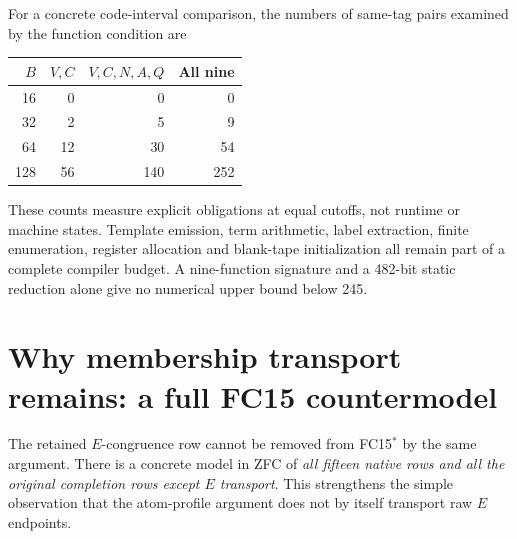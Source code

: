 For a concrete code-interval comparison, the numbers of same-tag pairs
examined by the function condition are
\begin{center}
\begin{tabular}{rrrr}
\toprule
$B$& $V,C$ & $V,C,N,A,Q$ & All nine\\
\midrule
16&0&0&0\\
32&2&5&9\\
64&12&30&54\\
128&56&140&252\\
\bottomrule
\end{tabular}
\end{center}
These counts measure explicit obligations at equal cutoffs, not runtime or
machine states. Template emission, term arithmetic, label extraction,
finite enumeration, register allocation and blank-tape initialization all
remain part of a complete compiler budget. A nine-function signature and
a 482-bit static reduction alone give no numerical upper bound below 245.

\section{Why membership transport remains: a full FC15 countermodel}

The retained $E$-congruence row cannot be removed from FC15$^*$ by the
same argument. There is a concrete model in ZFC of \emph{all fifteen
native rows and all the original completion rows except $E$ transport}.
This strengthens the simple observation that the atom-profile argument
does not by itself transport raw $E$ endpoints.

